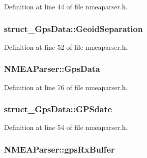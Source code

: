 Definition at line 44 of file nmeaparser.\-h.

\hypertarget{group___g_p_s_gadget_plugin_ga847e7e6776a9a2cdaf8c4cf0ce8e31ae}{
\subsubsection[{Geoid\-Separation}]{ struct\-\_\-\-Gps\-Data\-::\-Geoid\-Separation}}\label{group___g_p_s_gadget_plugin_ga847e7e6776a9a2cdaf8c4cf0ce8e31ae}


Definition at line 52 of file nmeaparser.\-h.

\hypertarget{group___g_p_s_gadget_plugin_ga5ed5a691ba188edd73dbfa5e6a72ee31}{
\subsubsection[{Gps\-Data}]{ N\-M\-E\-A\-Parser\-::\-Gps\-Data}}\label{group___g_p_s_gadget_plugin_ga5ed5a691ba188edd73dbfa5e6a72ee31}


Definition at line 76 of file nmeaparser.\-h.

\hypertarget{group___g_p_s_gadget_plugin_ga5556ea2f7e4f0fb213a319e72a5961eb}{
\subsubsection[{G\-P\-Sdate}]{ struct\-\_\-\-Gps\-Data\-::\-G\-P\-Sdate}}\label{group___g_p_s_gadget_plugin_ga5556ea2f7e4f0fb213a319e72a5961eb}


Definition at line 54 of file nmeaparser.\-h.

\hypertarget{group___g_p_s_gadget_plugin_gae55785b07246236cfe8d6c3139becff1}{
\subsubsection[{gps\-Rx\-Buffer}]{ N\-M\-E\-A\-Parser\-::gps\-Rx\-Buffer}}\label{group___g_p_s_gadget_plugin_gae55785b07246236cfe8d6c3139becff1}


